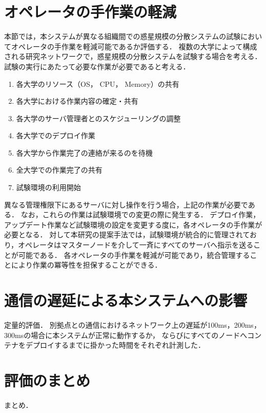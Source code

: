 \section{オペレータの手作業の軽減}

本節では，本システムが異なる組織間での惑星規模の分散システムの試験においてオペレータの手作業を軽減可能であるか評価する．
複数の大学によって構成される研究ネットワークで，惑星規模の分散システムを試験する場合を考える．
試験の実行にあたって必要な作業が必要であると考える．

\begin{enumerate}
  \item 各大学のリソース（OS， CPU， Memory）の共有
  \item 各大学における作業内容の確定・共有
  \item 各大学のサーバ管理者とのスケジューリングの調整
  \item 各大学でのデプロイ作業
  \item 各大学から作業完了の連絡が来るのを待機
  \item 全大学での作業完了の共有
  \item 試験環境の利用開始
\end{enumerate}

異なる管理権限下にあるサーバに対し操作を行う場合，上記の作業が必要である．
なお，これらの作業は試験環境での変更の際に発生する．
デプロイ作業，アップデート作業など試験環境の設定を変更する度に，各オペレータの手作業が必要となる．
対して本研究の提案手法では，試験環境が統合的に管理されており，オペレータはマスターノードを介して一斉にすべてのサーバへ指示を送ることが可能である．
各オペレータの手作業を軽減が可能であり，統合管理することにより作業の冪等性を担保することができる．

\section{通信の遅延による本システムへの影響}

定量的評価．
別拠点との通信におけるネットワーク上の遅延が100ms，200ms，300msの場合に本システムが正常に動作するか，
ならびにすべてのノードへコンテナをデプロイするまでに掛かった時間をそれぞれ計測した．

\section{評価のまとめ}

まとめ．

